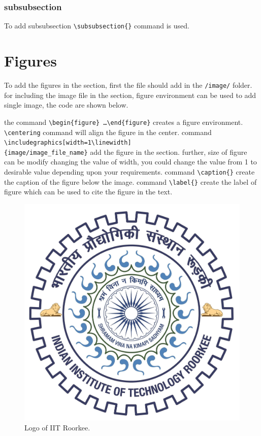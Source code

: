  

 \subsubsection{subsubsection}
 To add subsubsection \verb|\subsubsection{}| command is used.
 
  \section{Figures}
  To add the figures in the section, first the file should add in the \verb|/image/| folder. for including the image file in the section, figure environment can be used to add single image, the code are shown below.
 
 the command \verb|\begin{figure} …\end{figure}| creates a figure environment. \verb|\centering| command will align the figure in the center. command \verb|\includegraphics[width=1\linewidth]|
 \\ \verb|{image/image_file_name}| add the figure in the section. further, size of figure can be modify changing the value of width, you could change the value from 1 to desirable value depending upon your requirements. command \verb|\caption{}| create the caption of the figure below the image. command \verb|\label{}| create the label of figure which can be used to cite the figure in the text.
	\begin{figure}[htb!]
		\centering
		\includegraphics[width=1\linewidth]{image/iitrlogo.jpg} 
		\caption{\centering Logo of IIT Roorkee.} \label{Fig 1.1}
	\end{figure}
 
